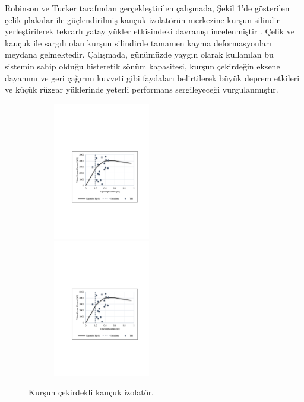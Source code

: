 Robinson ve Tucker tarafından gerçekleştirilen çalışmada, Şekil \ref{fig:LRBIsolator}'de
gösterilen çelik plakalar ile güçlendirilmiş kauçuk izolatörün merkezine
kurşun silindir yerleştirilerek tekrarlı yatay yükler etkisindeki
davranışı incelenmiştir \cite{RobinsonTucker1977}. Çelik ve kauçuk
ile sargılı olan kurşun silindirde tamamen kayma deformasyonları meydana
gelmektedir. Çalışmada, günümüzde yaygın olarak kullanılan bu sistemin
sahip olduğu histeretik sönüm kapasitesi, kurşun çekirdeğin eksenel
dayanımı ve geri çağırım kuvveti gibi faydaları belirtilerek büyük
deprem etkileri ve küçük rüzgar yüklerinde yeterli performans sergileyeceği
vurgulanmıştır.
\begin{figure}[h!]
\centering{}\includegraphics[width=6.5cm,height=6cm]{TikZ/Grafik_1}\hspace{1cm}
\includegraphics[width=6.5cm,height=6cm]{TikZ/Grafik_1}\caption{\label{fig:LRBIsolator} Kurşun çekirdekli kauçuk izolatör.}
\end{figure}

